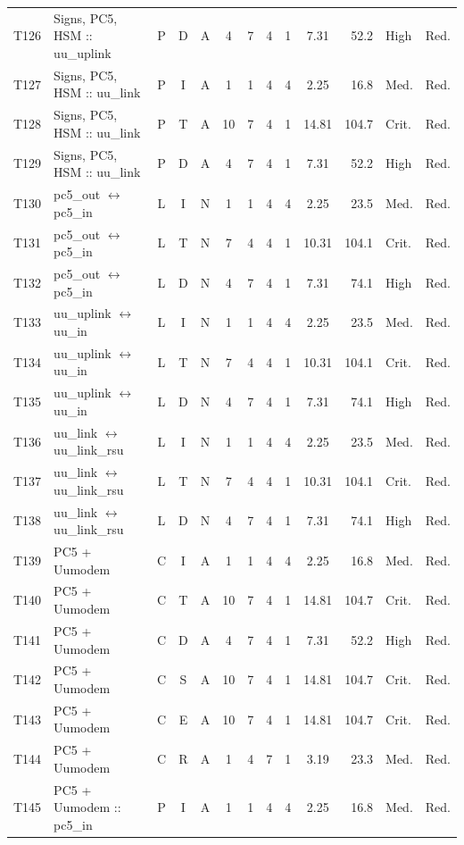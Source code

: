 \documentclass[9pt]{extarticle}
\begin{document}
\begin{longtable}{l>{\raggedright\arraybackslash}p{6.3cm}ccccccccrll}
T126 & Signs, PC5, HSM :: uu\_uplink & P & D & A & 4 & 7 & 4 & 1 & 7.31 & 52.2 & High & Red. \\
T127 & Signs, PC5, HSM :: uu\_link & P & I & A & 1 & 1 & 4 & 4 & 2.25 & 16.8 & Med. & Red. \\
T128 & Signs, PC5, HSM :: uu\_link & P & T & A & 10 & 7 & 4 & 1 & 14.81 & 104.7 & Crit. & Red. \\
T129 & Signs, PC5, HSM :: uu\_link & P & D & A & 4 & 7 & 4 & 1 & 7.31 & 52.2 & High & Red. \\
T130 & pc5\_out $\leftrightarrow$ pc5\_in & L & I & N & 1 & 1 & 4 & 4 & 2.25 & 23.5 & Med. & Red. \\
T131 & pc5\_out $\leftrightarrow$ pc5\_in & L & T & N & 7 & 4 & 4 & 1 & 10.31 & 104.1 & Crit. & Red. \\
T132 & pc5\_out $\leftrightarrow$ pc5\_in & L & D & N & 4 & 7 & 4 & 1 & 7.31 & 74.1 & High & Red. \\
T133 & uu\_uplink $\leftrightarrow$ uu\_in & L & I & N & 1 & 1 & 4 & 4 & 2.25 & 23.5 & Med. & Red. \\
T134 & uu\_uplink $\leftrightarrow$ uu\_in & L & T & N & 7 & 4 & 4 & 1 & 10.31 & 104.1 & Crit. & Red. \\
T135 & uu\_uplink $\leftrightarrow$ uu\_in & L & D & N & 4 & 7 & 4 & 1 & 7.31 & 74.1 & High & Red. \\
T136 & uu\_link $\leftrightarrow$ uu\_link\_rsu & L & I & N & 1 & 1 & 4 & 4 & 2.25 & 23.5 & Med. & Red. \\
T137 & uu\_link $\leftrightarrow$ uu\_link\_rsu & L & T & N & 7 & 4 & 4 & 1 & 10.31 & 104.1 & Crit. & Red. \\
T138 & uu\_link $\leftrightarrow$ uu\_link\_rsu & L & D & N & 4 & 7 & 4 & 1 & 7.31 & 74.1 & High & Red. \\
T139 & PC5 + Uumodem & C & I & A & 1 & 1 & 4 & 4 & 2.25 & 16.8 & Med. & Red. \\
T140 & PC5 + Uumodem & C & T & A & 10 & 7 & 4 & 1 & 14.81 & 104.7 & Crit. & Red. \\
T141 & PC5 + Uumodem & C & D & A & 4 & 7 & 4 & 1 & 7.31 & 52.2 & High & Red. \\
T142 & PC5 + Uumodem & C & S & A & 10 & 7 & 4 & 1 & 14.81 & 104.7 & Crit. & Red. \\
T143 & PC5 + Uumodem & C & E & A & 10 & 7 & 4 & 1 & 14.81 & 104.7 & Crit. & Red. \\
T144 & PC5 + Uumodem & C & R & A & 1 & 4 & 7 & 1 & 3.19 & 23.3 & Med. & Red. \\
T145 & PC5 + Uumodem :: pc5\_in & P & I & A & 1 & 1 & 4 & 4 & 2.25 & 16.8 & Med. & Red. \\

\end{longtable}
\end{document}
